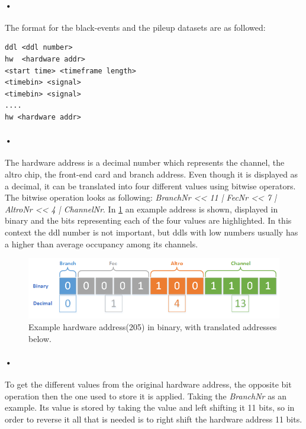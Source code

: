 \documentclass[a4paper, 12pt]{report}
\begin{document}
\paragraph{•} 
The format for the black-events and the pileup datasets are as followed:
\begin{minipage}{\linewidth}
\begin{lstlisting}[caption=Format for the black-event and pileup dataset., label=lst:black-event-format]
ddl <ddl number>
hw  <hardware addr>
<start time> <timeframe length>
<timebin> <signal>
<timebin> <signal>
....
hw <hardware addr>
\end{lstlisting}
\end{minipage}

\paragraph{•}
The hardware address is a decimal number which represents the channel, the \gls{altro} chip, the front-end card and branch address.
Even though it is displayed as a decimal, it can be translated into four different values using bitwise operators.
The bitwise operation looks as following: \textit{BranchNr << 11 | FecNr << 7 | AltroNr << 4 | ChannelNr}.
In \ref{fig:hw-binary} an example address is shown, displayed in binary and the bits representing each of the four values are highlighted.
In this context the ddl number is not important, but ddls with low numbers usually has a higher than average occupancy among its channels.

\begin{figure}[h!]
	\centering
		\includegraphics[width=1.0\textwidth]{images/hw-binary.png}
		\caption{Example hardware address(205) in binary, with translated addresses below.}
		\label{fig:hw-binary}
\end{figure}

\paragraph{•}
To get the different values from the original hardware address, the opposite bit operation then the one used to store it is applied.
Taking the \textit{BranchNr} as an example.
Its value is stored by taking the value and left shifting it 11 bits, so in order to reverse it all that is needed is to right shift the hardware address 11 bits.
\end{document}
